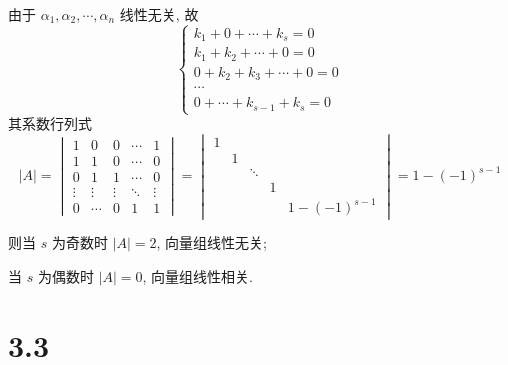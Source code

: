 		 由于 \( \alpha_{1}, \alpha_{2}, \cdots, \alpha_{n} \) 线性无关, 故
		 \[ \left\{ \begin{array}{l}
				 k_{1}   + 0      +  \cdots  +  k_{s} = 0      \\
				 k_{1}   + k_{2}  +  \cdots  +  0 = 0          \\
				 0       + k_{2}  +  k_{3}   +  \cdots + 0 = 0 \\
				 \cdots                                        \\
				 0       + \cdots +  k_{s-1} + k_{s} = 0
			 \end{array}\right. \]
		 其系数行列式 \[ |A| =
			 \begin{vmatrix}
				 1      & 0      & 0      & \cdots & 1      \\
				 1      & 1      & 0      & \cdots & 0      \\
				 0      & 1      & 1      & \cdots & 0      \\
				 \vdots & \vdots & \vdots & \ddots & \vdots \\
				 0      & \cdots & 0      & 1      & 1
			 \end{vmatrix} =
			 \begin{vmatrix}
				 1 &   &        &   &              \\
				   & 1 &        &   &              \\
				   &   & \ddots &   &              \\
				   &   &        & 1 &              \\
				   &   &        &   & 1-(-1)^{s-1}
			 \end{vmatrix} = 1 - (-1)^{s-1} \]

		 则当 \( s \) 为奇数时 \( |A| = 2 \), 向量组线性无关;

		 当 \( s \) 为偶数时 \( |A| = 0 \), 向量组线性相关.


\section{3.3}

 \subsection{} %


